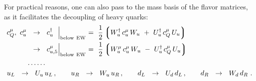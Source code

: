 \documentclass[12pt,preprintnumbers,nofootinbib]{revtex4}
\begin{document}
	For practical reasons, one can also pass to the mass basis of the 
	flavor matrices, as it facilitates the decoupling of heavy quarks:
\begin{align}
\label{gauge_mass_basis}
\notag
	c_Q^\mu,\  c_u^\mu  & ~~\rightarrow~~ c_{u\phantom{,5}}^\dag 
				\Bigl|_{\rm below\ EW}  ~=~ \frac{1}{2} 
			\left\lgroup W^\dag_u\, c_u^\mu\, W_u ~+~ U_u^\dag\, c_Q^\mu\, U_u 
						\right\rgroup
	\\
	&
	~~\rightarrow~~ c_{u,5}^\mu 
			\Bigl|_{\rm below\ EW}  ~=~ \frac{1}{2} 
			\left\lgroup W^\mu_u\, c_u^\mu\, W_u ~-~ U_u^\dag\, c_Q^\mu\, U_u 
						\right\rgroup
	\\
\notag
	& \dots\dots
	\\
\notag
	& 
	\hspace{-1.0cm}
	u_L ~~\rightarrow~~ U_u\, u_L\,,   \qquad u_R ~~\rightarrow~~ W_u\, u_R\,, \qquad 
	d_L ~~\rightarrow~~ U_d\, d_L\,,   \qquad d_R ~~\rightarrow~~ W_d\, d_R~.
\end{align}

\end{document}
